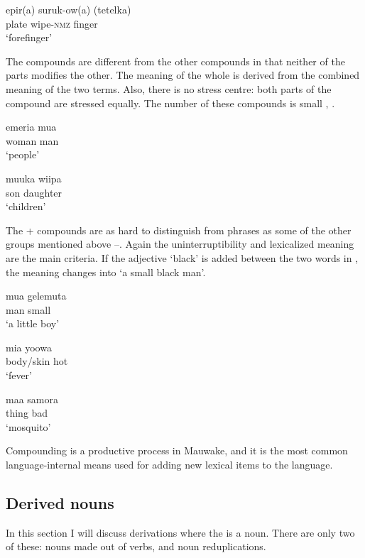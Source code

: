 \ea%
\label{ex:3:x61}
\gll epir(a) suruk-ow(a) (tetelka) \\
plate wipe-\textsc{nmz} finger\\
\glt`forefinger' 
\z  

The  compounds are different from the other compounds in that neither of the parts modifies the other. The meaning of the whole is derived from the combined meaning of the two terms. Also, there is no stress centre: both parts of the compound are stressed equally. The number of these compounds is small , .

\ea%
\label{ex:3:x50}
\gll emeria mua \\
woman man\\
\glt`people'
\z

\ea%
\label{ex:3:x51}
\gll muuka wiipa \\
son daughter\\
\glt`children'
\z

The + compounds are as hard to distinguish from phrases as some of the other groups mentioned above --. Again the uninterruptibility and lexicalized meaning are the main criteria. If the adjective  `black' is added between the two words in , the meaning changes into `a small black man'.

\ea%
\label{ex:3:x57}
\gll mua gelemuta \\
man small\\
\glt`a little boy'
\z

\ea%
\label{ex:3:x58}
\gll mia yoowa \\
body/skin hot\\
\glt`fever'
\z

\ea%
\label{ex:3:x59}
\gll maa samora \\
thing bad\\
\glt`mosquito'
\z

Compounding is a productive process in Mauwake, and it is the most common lan\-guage-internal means used for adding new lexical items to the language. 

\subsection{Derived nouns}\label{sec:3:2:6}
{}
In this section I will discuss derivations where the  is a noun. There are only two of these: nouns made out of verbs, and noun reduplications. 

